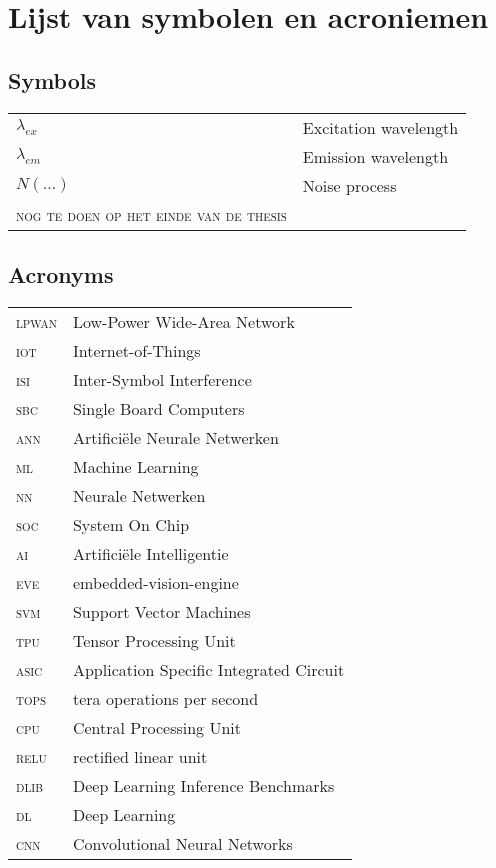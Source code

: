 \chapter*{Lijst van symbolen en acroniemen}

\section*{Symbols}


\begin{longtable}{ll}
$\lambda_{ex}$  &       Excitation wavelength\\
$\lambda_{em}$  &	Emission wavelength\\
$N(\ldots)$	&	Noise process\\
\textsc{nog te doen op het einde van de thesis}
\end{longtable}


\section*{Acronyms}

\begin{longtable}{ll}
\textsc{lpwan}	& Low-Power Wide-Area Network\\
\textsc{iot}	& Internet-of-Things\\
\textsc{isi}	& Inter-Symbol Interference\\
\textsc{sbc}	& Single Board Computers\\
\textsc{ann}	& Artifici\"ele Neurale Netwerken\\
\textsc{ml}	& Machine Learning\\
\textsc{nn}	& Neurale Netwerken\\
\textsc{soc}	& System On Chip\\
\textsc{ai}	& Artifici\"ele Intelligentie\\
\textsc{eve}	& embedded-vision-engine\\
\textsc{svm}	& Support Vector Machines\\
\textsc{tpu}	& Tensor Processing Unit\\
\textsc{asic}	& Application Specific Integrated Circuit\\
\textsc{tops}	& tera operations per second\\
\textsc{cpu}	& Central Processing Unit\\
\textsc{relu}	& rectified linear unit\\
\textsc{dlib}	& Deep Learning Inference Benchmarks\\
\textsc{dl}	& Deep Learning\\
\textsc{cnn}	& Convolutional Neural Networks\\
\end{longtable}


